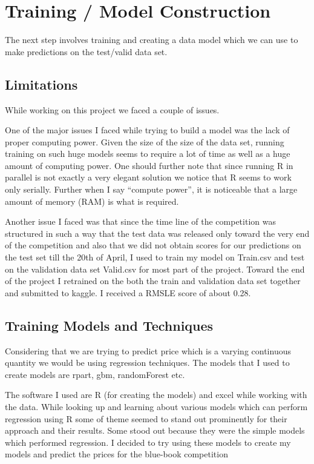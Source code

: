 \documentclass[paper=a4, fontsize=11pt]{scrartcl}	%
\numberwithin{equation}{section}		%
\numberwithin{figure}{section}			%
\numberwithin{table}{section}				%
\begin{document}
\section{Training / Model Construction}

The next step involves training and creating a data model which we can use to make predictions on the test/valid data set.

\subsection{Limitations}

While working on this project we faced a couple of issues.

One of the major issues I faced while trying to build a model was the lack of proper computing power. Given the size of the size of the data set, running training on such huge models seems to require a lot of time as well as a huge amount of computing power. One should further note that since running R in parallel is not exactly a very elegant solution we notice that R seems to work only serially. Further when I say ``compute power'', it is noticeable that a large amount of memory (RAM) is what is required. 

Another issue I faced was that since the time line of the competition was structured in such a way that the test data was released only toward the very end of the competition and also that we did not obtain scores for our predictions on the test set till the 20th of April, I used to train my model on Train.csv and test on the validation data set Valid.csv for most part of the project. Toward the end of the project I retrained on the both the train and validation data set together and submitted to kaggle. I received a RMSLE score of about 0.28. 

\subsection{Training Models and Techniques}

Considering that we are trying to predict price which is a varying continuous quantity we would be using regression techniques. The models that I used to create models are rpart, gbm, randomForest etc.

The software I used are R (for creating the models) and excel while working with the data. While looking up and learning about various models which can perform regression using R some of theme seemed to stand out prominently for their approach and their results. Some stood out because they were the simple models which performed regression. I decided to try using these models to create my models and predict the prices for the blue-book competition
\end{document}
